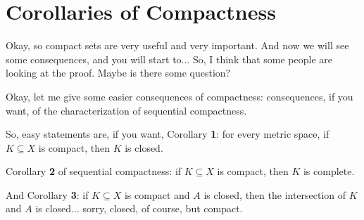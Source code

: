 \begin{hidden}
\end{hidden}

\section{Corollaries of Compactness}

\begin{speech}[00:20:50 - 00:23:12]
Okay, so compact sets are very useful and very important. And now we will see some consequences, and you will start to... So, I think that some people are looking at the proof. Maybe is there some question?


Okay, let me give some easier consequences of compactness: consequences, if you want, of the characterization of sequential compactness.

So, easy statements are, if you want, Corollary \textbf{1}:  for every metric space, if $K \subseteq X$ is compact, then $K$ is closed. 

Corollary \textbf{2} of sequential compactness:  if $K \subseteq X$ is compact, then $K$ is complete. 

And Corollary \textbf{3}:  if $K \subseteq X$ is compact and $A$ is closed, then the intersection of $K$ and $A$ is closed... sorry, closed, of course, but compact. 
\end{speech}

